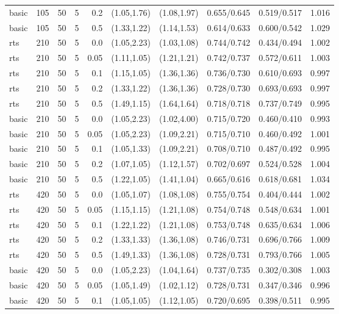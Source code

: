 \begin{tabular}{llrrrccccc}
basic & 105 & 50 & 5 & 0.2 & (1.05,1.76) & (1.08,1.97) & 0.655/0.645 & 0.519/0.517 & 1.016 \\
basic & 105 & 50 & 5 & 0.5 & (1.33,1.22) & (1.14,1.53) & 0.614/0.633 & 0.600/0.542 & 1.029 \\
rts & 210 & 50 & 5 & 0.0 & (1.05,2.23) & (1.03,1.08) & 0.744/0.742 & 0.434/0.494 & 1.002 \\
rts & 210 & 50 & 5 & 0.05 & (1.11,1.05) & (1.21,1.21) & 0.742/0.737 & 0.572/0.611 & 1.003 \\
rts & 210 & 50 & 5 & 0.1 & (1.15,1.05) & (1.36,1.36) & 0.736/0.730 & 0.610/0.693 & 0.997 \\
rts & 210 & 50 & 5 & 0.2 & (1.33,1.22) & (1.36,1.36) & 0.728/0.730 & 0.693/0.693 & 0.997 \\
rts & 210 & 50 & 5 & 0.5 & (1.49,1.15) & (1.64,1.64) & 0.718/0.718 & 0.737/0.749 & 0.995 \\
basic & 210 & 50 & 5 & 0.0 & (1.05,2.23) & (1.02,4.00) & 0.715/0.720 & 0.460/0.410 & 0.993 \\
basic & 210 & 50 & 5 & 0.05 & (1.05,2.23) & (1.09,2.21) & 0.715/0.710 & 0.460/0.492 & 1.001 \\
basic & 210 & 50 & 5 & 0.1 & (1.05,1.33) & (1.09,2.21) & 0.708/0.710 & 0.487/0.492 & 0.995 \\
basic & 210 & 50 & 5 & 0.2 & (1.07,1.05) & (1.12,1.57) & 0.702/0.697 & 0.524/0.528 & 1.004 \\
basic & 210 & 50 & 5 & 0.5 & (1.22,1.05) & (1.41,1.04) & 0.665/0.616 & 0.618/0.681 & 1.034 \\
rts & 420 & 50 & 5 & 0.0 & (1.05,1.07) & (1.08,1.08) & 0.755/0.754 & 0.404/0.444 & 1.002 \\
rts & 420 & 50 & 5 & 0.05 & (1.15,1.15) & (1.21,1.08) & 0.754/0.748 & 0.548/0.634 & 1.001 \\
rts & 420 & 50 & 5 & 0.1 & (1.22,1.22) & (1.21,1.08) & 0.753/0.748 & 0.635/0.634 & 1.006 \\
rts & 420 & 50 & 5 & 0.2 & (1.33,1.33) & (1.36,1.08) & 0.746/0.731 & 0.696/0.766 & 1.009 \\
rts & 420 & 50 & 5 & 0.5 & (1.49,1.33) & (1.36,1.08) & 0.728/0.731 & 0.793/0.766 & 1.005 \\
basic & 420 & 50 & 5 & 0.0 & (1.05,2.23) & (1.04,1.64) & 0.737/0.735 & 0.302/0.308 & 1.003 \\
basic & 420 & 50 & 5 & 0.05 & (1.05,1.49) & (1.02,1.12) & 0.728/0.731 & 0.347/0.346 & 0.996 \\
basic & 420 & 50 & 5 & 0.1 & (1.05,1.05) & (1.12,1.05) & 0.720/0.695 & 0.398/0.511 & 0.995 \\

\end{tabular}

